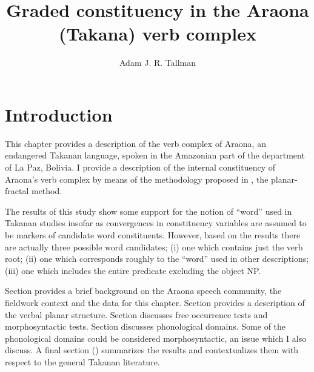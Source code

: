 \documentclass[output=paper,hidelinks]{langscibook}
\author{Adam J. R. Tallman\affiliation{Friedrich-Schiller-Universität Jena; The National Museum of Folklore and Ethnography - La Paz}}
\title{Graded constituency in the Araona (Takana) verb complex}
\begin{document}
\maketitle


\section{Introduction} %
\label{araona:sec:introduction}





This chapter provides a description of the verb complex of Araona, an endangered Takanan language, spoken in the Amazonian part of the department of La Paz, Bolivia.  I provide a description of the internal constituency of Araona's verb complex by means of the methodology proposed in \citet{Tallman2021}, the planar-fractal method.

The results of this study show some support for the notion of ``word'' used in Takanan studies insofar as convergences in constituency variables are assumed to be markers of candidate word constituents. However, based on the results there are actually three possible word candidates;
(i) one which contains just the verb root;
(ii) one which corresponds roughly to the ``word'' used in other descriptions;
(iii) one which includes the entire predicate excluding the object NP.

Section  provides a brief background on the Araona speech community, the fieldwork context and the data for this chapter.
Section  provides a description of the verbal planar structure. Section  discusses free occurrence tests and morphosyntactic tests.
Section  discusses phonological domains. Some of the phonological domains could be considered morphosyntactic, an issue which I also discuss.
A final section () summarizes the results and contextualizes them with respect to the general Takanan literature.
\end{document}
